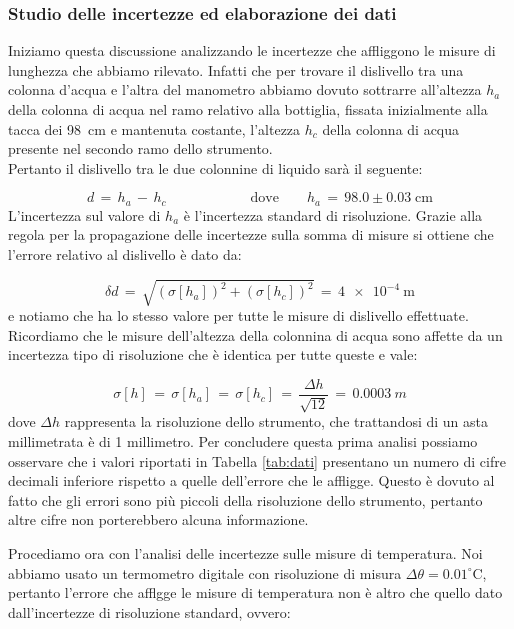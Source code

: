 \subsubsection{Studio delle incertezze ed elaborazione dei dati}
\label{dati_incertezze}

Iniziamo questa discussione analizzando le incertezze che affliggono le misure di lunghezza che abbiamo rilevato. Infatti che per trovare il dislivello tra una colonna d'acqua e l'altra del manometro abbiamo dovuto sottrarre all'altezza $h_a$ della colonna di acqua nel ramo relativo alla bottiglia, fissata inizialmente alla tacca dei \SI{98}{\centi\metre} e mantenuta costante, l'altezza $h_c$ della colonna di acqua presente nel secondo ramo dello strumento.\\
Pertanto il dislivello tra le due colonnine di liquido sarà il seguente:

\begin{equation*}
    d \,=\, h_a \,-\, h_c \qquad \qquad \qquad \text{dove} \qquad h_a \,=\, 98.0 \pm 0.03 \; \si{\centi\metre} 
\end{equation*}
%
L'incertezza sul valore di $h_a$ è l'incertezza standard di risoluzione.
Grazie alla regola per la propagazione delle incertezze sulla somma di misure si ottiene che l'errore relativo al dislivello è dato da:

\begin{equation*}
    \delta d \,=\, \sqrt{(\sigma [h_a])^2+(\sigma [h_c])^2} \,=\, \SI{4e-4}{\metre}
\end{equation*}
%
e notiamo che ha lo stesso valore per tutte le misure di dislivello effettuate. Ricordiamo che le misure dell'altezza della colonnina di acqua sono affette da un incertezza tipo di risoluzione che è identica per tutte queste e vale:

\begin{equation*}
	\sigma [h] \,=\, \sigma [h_a] \,=\, \sigma [h_c] \,=\, \frac{\Delta h}{\sqrt{12}} \,=\, \SI{0.0003}{m} 
\end{equation*}
%
dove $\Delta h$ rappresenta la risoluzione dello strumento, che trattandosi di un asta millimetrata è di 1 millimetro. Per concludere questa prima analisi possiamo osservare che i valori riportati in Tabella \ref{tab:dati} presentano un numero di cifre decimali inferiore rispetto a quelle dell'errore che le affligge. Questo è dovuto al fatto che gli errori sono più piccoli della risoluzione dello strumento, pertanto altre cifre non porterebbero alcuna informazione.

Procediamo ora con l'analisi delle incertezze sulle misure di temperatura. Noi abbiamo usato un termometro digitale con risoluzione di misura $\Delta \theta = 0.01 ^\circ$C, pertanto l'errore che afflgge le misure di temperatura non è altro che quello dato dall'incertezze di risoluzione standard, ovvero:

